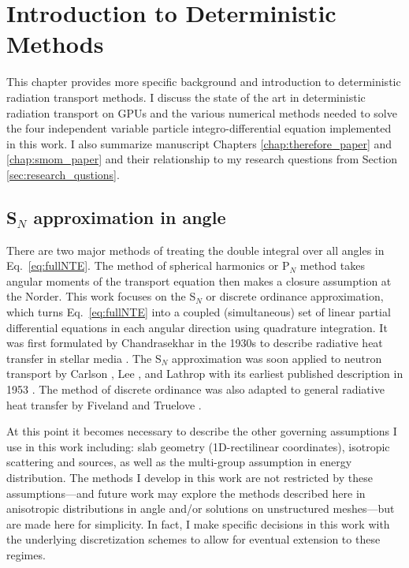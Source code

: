 \chapter{Introduction to Deterministic Methods}
\label{chap:determ_intro}


This chapter provides more specific background and introduction to deterministic radiation transport methods.
I discuss the state of the art in deterministic radiation transport on GPUs and the various numerical methods needed to solve the four independent variable particle integro-differential equation implemented in this work.
I also summarize manuscript Chapters \ref{chap:therefore_paper} and \ref{chap:smom_paper} and their relationship to my research questions from Section \ref{sec:research_qustions}.

\section{S$_N$ approximation in angle}

There are two major methods of treating the double integral over all angles in Eq.~\eqref{eq:fullNTE}.
The method of spherical harmonics or P$_{N}$ method takes angular moments of the transport equation then makes a closure assumption at the N\ths  order.
This work focuses on the S$_N$ or discrete ordinance approximation, which turns Eq.~\eqref{eq:fullNTE} into a coupled (simultaneous) set of linear partial differential equations in each angular direction using quadrature integration.
It was first formulated by Chandrasekhar in the 1930s to describe radiative heat transfer in stellar media \cite{chandrasekhar1960radiative}.
The S$_N$ approximation was soon applied to neutron transport by Carlson \cite{precise1971carlson}, Lee \cite{discrete1961lee}, and Lathrop \cite{discrete1966lathnrop} with its earliest published description in 1953 \cite{carlson_1955_sn}.
The method of discrete ordinance was also adapted to general radiative heat transfer by Fiveland \cite{three1988fiveland} and Truelove \cite{discrete1987truelove}.

At this point it becomes necessary to describe the other governing assumptions I use in this work including:
slab geometry (1D-rectilinear coordinates), isotropic scattering and sources, as well as the multi-group assumption in energy distribution.
The methods I develop in this work are not restricted by these assumptions---and future work may explore the methods described here in anisotropic distributions in angle and/or solutions on unstructured meshes---but are made here for simplicity.
In fact, I make specific decisions in this work with the underlying discretization schemes to allow for eventual extension to these regimes.

